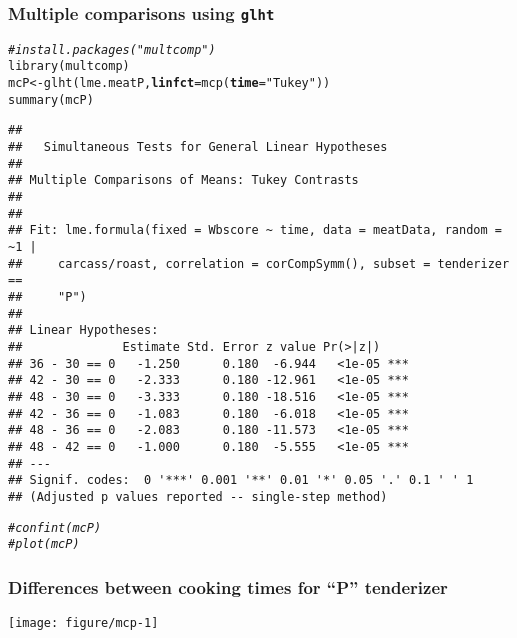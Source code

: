 \documentclass[color=usenames,dvipsnames]{beamer}\usepackage[]{graphicx}\usepackage[]{color}
\makeatletter
\newcommand{\hlstr}[1]{\textcolor[rgb]{0.749,0.012,0.012}{#1}}%
\newcommand{\hlcom}[1]{\textcolor[rgb]{0.514,0.506,0.514}{\textit{#1}}}%
\newcommand{\hlstd}[1]{\textcolor[rgb]{0,0,0}{#1}}%
\newcommand{\hlkwb}[1]{\textcolor[rgb]{0,0.341,0.682}{#1}}%
\newcommand{\hlkwc}[1]{\textcolor[rgb]{0,0,0}{\textbf{#1}}}%
\newcommand{\hlkwd}[1]{\textcolor[rgb]{0.004,0.004,0.506}{#1}}%
\newenvironment{kframe}{%
 \def\at@end@of@kframe{}%
 \ifinner\ifhmode%
  \def\at@end@of@kframe{\end{minipage}}%
  \begin{minipage}{\columnwidth}%
 \fi\fi%
 \def\FrameCommand##1{\hskip\@totalleftmargin \hskip-\fboxsep
 \colorbox{shadecolor}{##1}\hskip-\fboxsep
     \hskip-\linewidth \hskip-\@totalleftmargin \hskip\columnwidth}%
 \MakeFramed {\advance\hsize-\width
   \@totalleftmargin\z@ \linewidth\hsize
   \@setminipage}}%
 {\par\unskip\endMakeFramed%
 \at@end@of@kframe}
\newenvironment{knitrout}{}{} %
\newcommand{\inr}[1]{\colorbox{inlinecolor}{\texttt{#1}}}
\makeatother
\begin{document}
\begin{frame}[fragile]
  \frametitle{Multiple comparisons using {\tt glht}}
\scriptsize %
\begin{knitrout}\tiny
{}\color{fgcolor}\begin{kframe}
\begin{alltt}
\hlcom{# install.packages("multcomp")}
\hlkwd{library}\hlstd{(multcomp)}
\hlstd{mcP} \hlkwb{<-} \hlkwd{glht}\hlstd{(lme.meatP,} \hlkwc{linfct}\hlstd{=}\hlkwd{mcp}\hlstd{(}\hlkwc{time}\hlstd{=}\hlstr{"Tukey"}\hlstd{))}
\hlkwd{summary}\hlstd{(mcP)}
\end{alltt}
\begin{verbatim}
## 
## 	 Simultaneous Tests for General Linear Hypotheses
## 
## Multiple Comparisons of Means: Tukey Contrasts
## 
## 
## Fit: lme.formula(fixed = Wbscore ~ time, data = meatData, random = ~1 | 
##     carcass/roast, correlation = corCompSymm(), subset = tenderizer == 
##     "P")
## 
## Linear Hypotheses:
##              Estimate Std. Error z value Pr(>|z|)    
## 36 - 30 == 0   -1.250      0.180  -6.944   <1e-05 ***
## 42 - 30 == 0   -2.333      0.180 -12.961   <1e-05 ***
## 48 - 30 == 0   -3.333      0.180 -18.516   <1e-05 ***
## 42 - 36 == 0   -1.083      0.180  -6.018   <1e-05 ***
## 48 - 36 == 0   -2.083      0.180 -11.573   <1e-05 ***
## 48 - 42 == 0   -1.000      0.180  -5.555   <1e-05 ***
## ---
## Signif. codes:  0 '***' 0.001 '**' 0.01 '*' 0.05 '.' 0.1 ' ' 1
## (Adjusted p values reported -- single-step method)
\end{verbatim}
\begin{alltt}
\hlcom{# confint(mcP)}
\hlcom{# plot(mcP)}
\end{alltt}
\end{kframe}
\end{knitrout}
\end{frame}



\begin{frame}[fragile]
  \frametitle{\small Differences between cooking times for ``P'' tenderizer}
  \centering \footnotesize %

\texttt{[image: figure/mcp-1]} \\
\end{frame}
\end{document}
